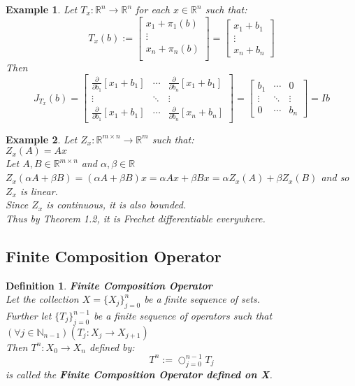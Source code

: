 \documentclass[12pt]{extarticle}
\theoremstyle{plain}
\theoremstyle{Definition}
\newtheorem{def.}{Definition}[section]
\theoremstyle{Definition}
\theoremstyle{plain}
\newtheorem{exmp}{Example}[section]
\begin{document}
\begin{exmp} 
	Let $T_x : \mathbb{R}^n \to \mathbb{R}^n$ for each $x \in \mathbb{R}^n$ such that:
	\[
	T_x(b) := 
	\begin{bmatrix}
	x_1 + \pi_1(b) \\ 
	\vdots \\ 
	x_n + \pi_n(b) \\ 
	\end{bmatrix}
	= 
	\begin{bmatrix}
	x_1 + b_1 \\ 
	\vdots \\ 
	x_n + b_n
	\end{bmatrix}
	\]
	Then
	\[
	J_{T_x}(b) = 
	\begin{bmatrix} 
	\frac{\partial }{\partial b_1}[x_1 + b_1] & \cdots & \frac{\partial }{\partial b_n}[x_1 + b_1] \\
	\vdots & \ddots & \vdots \\ 
	\frac{\partial }{\partial b_1}[x_1 + b_1] & \cdots & \frac{\partial }{\partial b_n}[x_n + b_n] 
	\end{bmatrix}
	=
	\begin{bmatrix} 
	b_1 & \cdots & 0 \\
	\vdots & \ddots & \vdots \\ 
	0 & \cdots & b_n
	\end{bmatrix}
	= Ib
	\]
\end{exmp}

\begin{exmp}
		Let $Z_x : \mathbb{R}^{m\times n} \to \mathbb{R}^m$ such that: \\ 
		$Z_x(A) = Ax$ \\
		Let $A,B \in \mathbb{R}^{m\times n}$ and $\alpha,\beta \in \mathbb{R}$ \\ 
		$Z_x(\alpha A + \beta B) =  (\alpha A + \beta B)x = \alpha Ax + \beta Bx = \alpha Z_x(A) + \beta Z_x(B)$ and so $Z_x$ is linear. \\ 
		Since $Z_x$ is continuous, it is also bounded. \\ 
		Thus by Theorem 1.2, it is Frechet differentiable everywhere. 
\end{exmp}

\subsection{Finite Composition Operator}
\begin{def.} \textbf{Finite Composition Operator} \\ 
	Let the collection $X = \{X_j\}_{j=0}^{n}$ be a finite sequence of sets. \\ 
	Further let $\{T_j\}_{j=0}^{n-1}$ be a finite sequence of operators such that $(\forall j \in \mathbb{N}_{n-1})(T_j : X_j \to X_{j+1})$ \\ 
	Then $T^n : X_0 \to X_{n}$ defined by: 
	$$T^n := \bigcirc_{j=0}^{n-1} T_j$$ 
	is called the \textbf{Finite Composition Operator defined on X}. \\ 
\end{def.}
\end{document}

